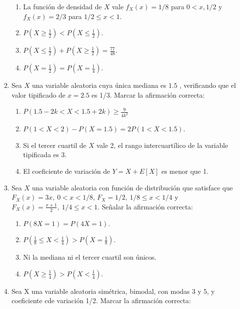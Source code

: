 \documentclass[fleqn]{article}
\begin{document}
\begin{enumerate}
        \begin{enumerate}
          \item La función de densidad de $X$ vale $f_X(x) = 1/8$ para $0 < x , 1/2$ y $f_X(x) = 2/3$ para $1/2 \le x < 1$.
          \item $P(X \ge \frac{1}{2}) < P(X \le \frac{1}{2})$.
          \item $P(X \le \frac{1}{2}) + P(X \ge \frac{1}{2}) = \frac{77}{48}$.
          \item $P(X = \frac{1}{2}) = P(X = \frac{1}{4})$.
        \end{enumerate}

  \item Sea $X$ una variable aleatoria cuya única mediana es $1.5$ , verificando que el valor tipificado de $x = 2.5$ es 1/3. Marcar la afirmación correcta:

        \begin{enumerate}
          \item $P(1.5 - 2k < X < 1.5 + 2k) \ge \frac{9}{4k^2}$
          \item $P(1 < X < 2) - P(X = 1.5) = 2P(1 < X < 1.5)$.
          \item Si el tercer cuartil de $X$ vale 2, el rango intercuartílico de la variable tipificada es $3$.
          \item El coeficiente de variación de $Y = X + E[X]$ es menor que 1.
        \end{enumerate}

  \item  Sea $X$ una variable aleatoria con función de distribución que satisface que $F_X(x) = 3x,\ 0 < x < 1/8$, $F_X = 1/2,\ 1/8 \le x < 1/4$ y $F_X(x) = \frac{x + 1}{2},\ 1/4 \le x < 1$. Señalar la afirmación correcta:

        \begin{enumerate}
          \item $P(8X = 1) = P(4X = 1)$.
          \item $P(\frac{1}{8} \le X < \frac{1}{4}) > P(X = \frac{1}{8})$.
          \item Ni la mediana ni el tercer cuartil son únicos.
          \item $P(X \ge \frac{1}{4}) > P(X < \frac{1}{4})$.
        \end{enumerate}

  \item Sea X una variable aleatoria simétrica, bimodal, con modas 3 y 5, y coeficiente cde variación 1/2. Marcar la afirmación correcta:


\end{enumerate}
\end{document}
